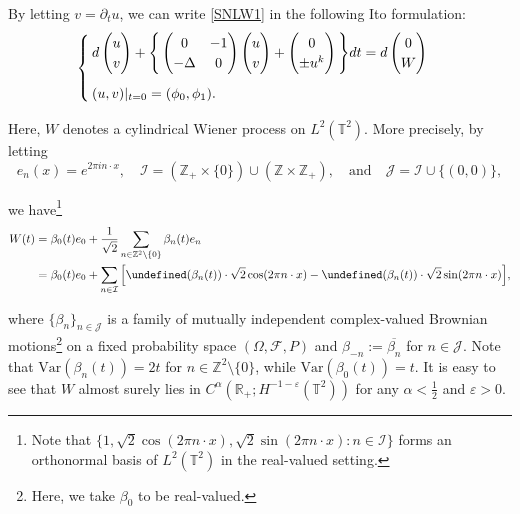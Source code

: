 \documentclass[letterpaper, 11pt,  reqno]{amsart}
\newcommand{\1}{\hspace{0.5mm}\text{I}\hspace{0.5mm}}
\newcommand{\I}{\mathcal{I}}
\newcommand{\noi}{\noindent}
\newcommand{\Z}{\mathbb{Z}}
\newcommand{\R}{\mathbb{R}}
\newcommand{\T}{\mathbb{T}}
\let\Re=\undefined\DeclareMathOperator*{\Re}{Re}
\let\Im=\undefined\DeclareMathOperator*{\Im}{Im}
\newcommand{\F}{\mathcal{F}}
\newcommand{\al}{\alpha}
\newcommand{\be}{\beta}
\newcommand{\Dl}{\Delta}
\newcommand{\eps}{\varepsilon}
\newcommand{\cj}{\overline}
\newcommand{\dt}{\partial_t}
\renewcommand{\O}{\Omega}
\numberwithin{equation}{section}
\numberwithin{theorem}{section}
\begin{document}
By letting $v = \dt u$, we can write \eqref{SNLW1}
in the following Ito formulation:
\begin{align}
\begin{cases}
d  \begin{pmatrix}
u \\ v
\end{pmatrix}
+ \Bigg\{
\begin{pmatrix}
0 & -1\\
-\Dl & 0
\end{pmatrix}
 \begin{pmatrix}
u \\ v 
\end{pmatrix}
+  
\begin{pmatrix}
0 \\ \pm u^k
\end{pmatrix}
\Bigg\} dt 
 = d \begin{pmatrix}
0  \\W
\end{pmatrix}\\
\rule{0mm}{6mm}(u, v) |_{t = 0} = (\phi_0, \phi_1).
\end{cases}
\label{SNLW2}
\end{align}

\noi
Here, $W$ denotes
a cylindrical Wiener process on $L^2(\T^2)$.
More precisely, by letting 
\[e_n(x) = e^{2\pi i n \cdot x}, \quad 
\I = (\Z_+\times \{0\}) \cup (\Z\times \Z_+),
\quad \text{and}\quad \mathcal{J} = \I \cup\{(0, 0)\},\]

\noi
we have\footnote{Note that $\{1, \sqrt 2\cos(2\pi n\cdot x), \sqrt 2 \sin (2\pi n \cdot x):
n \in \I \}$ forms an orthonormal basis of $L^2(\T^2)$ in the real-valued setting.}
\begin{align}
 W(t) & = \be_0(t) e_0 + \frac{1}{\sqrt 2} \sum_{n\in \Z^{2}\setminus\{0\}}
\be_n (t) e_n\notag \\
& = \be_0(t) e_0 +  \sum_{n\in \I}
\Big[\Re(\be_n (t)) \cdot \sqrt 2 \cos (2\pi n \cdot x)
- \Im(\be_n (t) )\cdot \sqrt 2 \sin (2\pi n \cdot x)\Big],
\label{Wiener1}
\end{align}

\noi
where $\{ \be_n\}_{n \in \mathcal{J}}$ is a family of  mutually independent complex-valued Brownian
motions\footnote{Here, we take $\be_0$ to be real-valued.}
on a fixed probability space $(\O, \F, P)$
and $\be_{-n} := \cj{\be_n}$ for $n \in \mathcal{J}$.
Note that $\text{Var}(\be_n(t)) = 2t$ for $n \in \Z^2 \setminus\{0\}$, 
while 
 $\text{Var}(\be_0(t)) = t$.
It is easy to see that $W$ almost surely lies in 
$C^{\al}(\R_+;H^{-1-\eps}(\T^2))$
for any $\al < \frac 12$ and $\eps > 0$.
\end{document}

